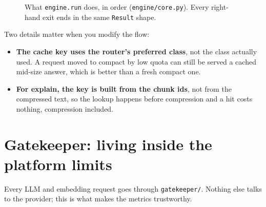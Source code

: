 \documentclass[11pt,a4paper]{article}
\renewcommand{\_}{\origus\allowbreak}
\begin{document}
\begin{figure}[H]
\caption{What \texttt{engine.run} does, in order (\texttt{engine/core.py}). Every right-hand exit ends in the same \texttt{Result} shape.}
\label{fig:lifecycle}
\end{figure}

Two details matter when you modify the flow:

\begin{itemize}
  \item \textbf{The cache key uses the router's preferred class}, not the class actually used. A request
  moved to compact by low quota can still be served a cached mid-size answer, which is better than a
  fresh compact one.
  \item \textbf{For explain, the key is built from the chunk ids}, not from the compressed text, so the
  lookup happens before compression and a hit costs nothing, compression included.
\end{itemize}

\section{Gatekeeper: living inside the platform limits}
\label{sec:gatekeeper}

Every LLM and embedding request goes through \texttt{gatekeeper/}. Nothing else talks to the provider;
this is what makes the metrics trustworthy.
\end{document}
